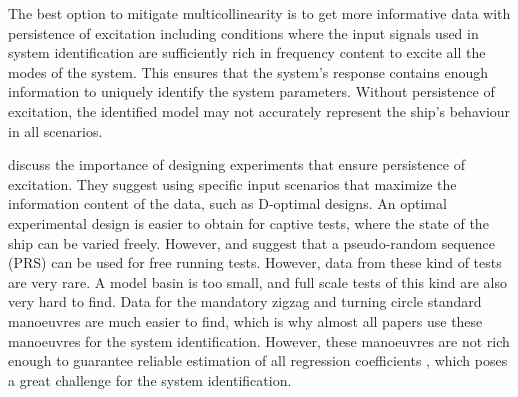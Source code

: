 The best option to mitigate multicollinearity is to get more informative data with persistence of excitation including conditions where the input signals used in system identification are sufficiently rich in frequency content to excite all the modes of the system. This ensures that the system's response contains enough information to uniquely identify the system parameters. Without persistence of excitation, the identified model may not accurately represent the ship's behaviour in all scenarios.

\textcite{yoonIdentificationHydrodynamicCoefficients2003} discuss the importance of designing experiments that ensure persistence of excitation. They suggest using specific input scenarios that maximize the information content of the data, such as D-optimal designs. An optimal experimental design is easier to obtain for captive tests, where the state of the ship can be varied freely. However, \textcite{wangOptimalDesignExcitation2020} and \textcite{millerShipModelIdentification2021} suggest that a pseudo-random sequence (PRS) can be used for free running tests.  However, data from these kind of tests are very rare. A model basin is too small, and full scale tests of this kind are also very hard to find. 
Data for the mandatory zigzag and turning circle standard manoeuvres \cite{imoStandardsShipManoeuvrability2002} are much easier to find, which is why almost all papers use these manoeuvres for the system identification. However, these manoeuvres are not rich enough to guarantee reliable estimation of all regression coefficients \cite{sutuloAlgorithmOfflineIdentification2014}, which poses a great challenge for the system identification.
\clearpage

